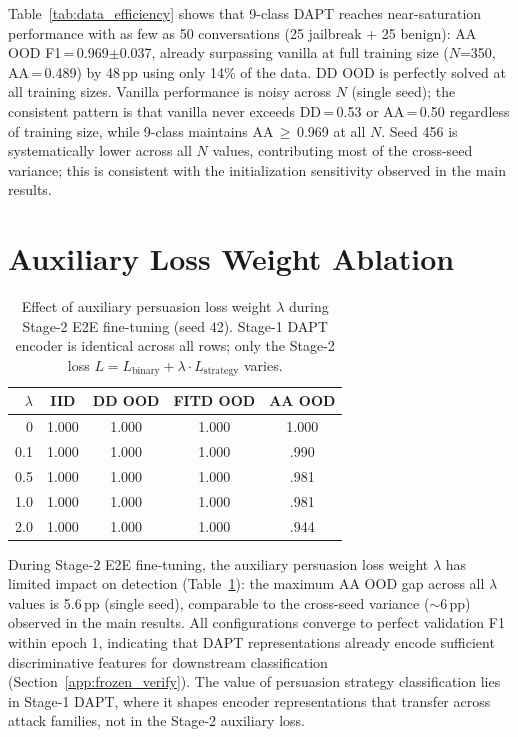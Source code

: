 Table~\ref{tab:data_efficiency} shows that 9-class DAPT reaches near-saturation performance with as few as 50 conversations (25 jailbreak + 25 benign): AA OOD F1\,=\,0.969$\pm$0.037, already surpassing vanilla at full training size ($N$=350, AA\,=\,0.489) by 48\,pp using only 14\% of the data. DD OOD is perfectly solved at all training sizes. Vanilla performance is noisy across $N$ (single seed); the consistent pattern is that vanilla never exceeds DD\,=\,0.53 or AA\,=\,0.50 regardless of training size, while 9-class maintains AA\,$\geq$\,0.969 at all $N$. Seed 456 is systematically lower across all $N$ values, contributing most of the cross-seed variance; this is consistent with the initialization sensitivity observed in the main results.

\section{Auxiliary Loss Weight Ablation}
\label{app:lambda}

\begin{table}[ht]
\centering
\footnotesize
\caption{Effect of auxiliary persuasion loss weight $\lambda$ during Stage-2 E2E fine-tuning (seed 42). Stage-1 DAPT encoder is identical across all rows; only the Stage-2 loss $L = L_{\text{binary}} + \lambda \cdot L_{\text{strategy}}$ varies.}
\label{tab:lambda}
\begin{tabular}{@{}rcccc@{}}
\toprule
$\lambda$ & IID & DD OOD & FITD OOD & AA OOD \\
\midrule
0 & 1.000 & 1.000 & 1.000 & 1.000 \\
0.1 & 1.000 & 1.000 & 1.000 & .990 \\
0.5 & 1.000 & 1.000 & 1.000 & .981 \\
1.0 & 1.000 & 1.000 & 1.000 & .981 \\
2.0 & 1.000 & 1.000 & 1.000 & .944 \\
\bottomrule
\end{tabular}
\end{table}

During Stage-2 E2E fine-tuning, the auxiliary persuasion loss weight $\lambda$ has limited impact on detection (Table~\ref{tab:lambda}): the maximum AA OOD gap across all $\lambda$ values is 5.6\,pp (single seed), comparable to the cross-seed variance ($\sim$6\,pp) observed in the main results. All configurations converge to perfect validation F1 within epoch 1, indicating that DAPT representations already encode sufficient discriminative features for downstream classification (Section~\ref{app:frozen_verify}). The value of persuasion strategy classification lies in Stage-1 DAPT, where it shapes encoder representations that transfer across attack families, not in the Stage-2 auxiliary loss.

